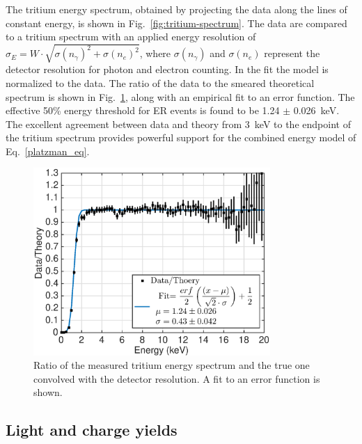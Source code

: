 The tritium energy spectrum, obtained by projecting the data along the lines of constant energy, is shown in Fig.~\ref{fig:tritium-spectrum}. The data are compared to a tritium spectrum with an applied energy resolution of $ \sigma_E = W \cdot \sqrt{\sigma(n_{\gamma})^2 + \sigma(n_e)^2}$, where $ \sigma(n_{\gamma})$ and $ \sigma(n_e)$ represent the detector resolution for photon and electron counting. In the fit the model is normalized to the data. The ratio of the data to the smeared theoretical spectrum is shown in Fig.~\ref{fig:ER-threshold}, along with an empirical fit to an error function. The effective 50\% energy threshold for ER events is found to be 1.24 $\pm$ 0.026~keV. The excellent agreement between data and theory from 3~keV to the endpoint of the tritium spectrum provides powerful support for the combined energy model of Eq.~\ref{platzman_eq}.

\begin{figure}[h!]
\includegraphics[width=90mm]{fig/E_Thres_Fit.eps}
\caption{Ratio of the measured tritium energy spectrum and the true one convolved with the detector resolution. A fit to an error function is shown.}
\label{fig:ER-threshold}
\end{figure}

\subsection{Light and charge yields}

